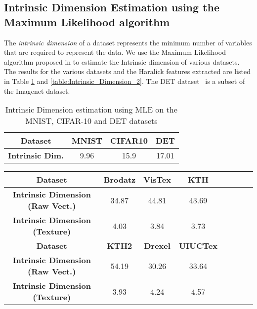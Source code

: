 \documentclass[11pt,a4paper]{article}
\begin{document}
\subsection{Intrinsic Dimension Estimation using the Maximum Likelihood algorithm}
The \emph{intrinsic dimension} of a dataset represents the minimum number of variables that are required to represent the data. We use the Maximum Likelihood algorithm proposed in \cite{MLE04} to estimate the Intrinsic dimension of various datasets. The results for the various datasets and the Haralick features extracted are listed in Table \ref{table:Intrinsic_Dimension_1} and  \ref{table:Intrinsic_Dimension_2}. The DET dataset~\cite{ILSVRC15} is a subset of the Imagenet dataset.

\begin{table}[h]
\centering
\begin{tabular}{ | c | c | c | c | }
    \hline
 \textbf{Dataset}  &MNIST& CIFAR10 & DET \\  \hline
  \textbf{Intrinsic Dim.} & 9.96 & 15.9  &  17.01 \\ \hline 
  \end{tabular}
  \caption{Intrinsic Dimension estimation using MLE on the MNIST, CIFAR-10  and DET datasets}
  \label{table:Intrinsic_Dimension_1}
\end{table}

\begin{table*}[ht!]
\centering
\begin{tabular}{ | c | c | c | c | c | c | c | c |}
    \hline
 \textbf{Dataset}  & \textbf{Brodatz} & \textbf{VisTex} & \textbf{KTH}  \\  \hline
  \textbf{Intrinsic Dimension (Raw Vect.)} & 34.87 & 44.81 & 43.69 \\ \hline
  \textbf{Intrinsic Dimension (Texture)} & 4.03 & 3.84 & 3.73 \\ \hline
  \textbf{Dataset}  & \textbf{KTH2} & \textbf{Drexel} & \textbf{UIUCTex} \\  \hline
  \textbf{Intrinsic Dimension (Raw Vect.)} & 54.19 & 30.26 & 33.64\\ \hline
  \textbf{Intrinsic Dimension (Texture)} & 3.93 & 4.24 & 4.57\\ \hline
  \end{tabular}
  \caption{Intrinsic Dimension estimation using MLE on the 6 texture datasets}
  \label{table:Intrinsic_Dimension_2}
\end{table*}
\end{document}
